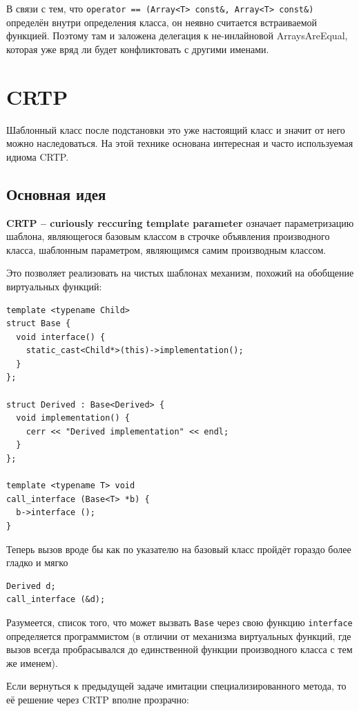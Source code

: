 \documentclass[a4paper,12pt,oneside]{book}
\begin{document}
В связи с тем, что \lstinline!operator == (Array<T> const&, Array<T> const&)! определён внутри определения класса, он неявно считается встраиваемой функцией. Поэтому там и заложена делегация к не-инлайновой ArraysAreEqual, которая уже вряд ли будет конфликтовать с другими именами.

\pagebreak
\section{CRTP}\label{CRTP}

Шаблонный класс после подстановки это уже настоящий класс и значит от него можно наследоваться. На этой технике основана интересная и часто используемая идиома CRTP.

\subsection{Основная идея}

\textbf{CRTP – curiously reccuring template parameter} означает параметризацию шаблона, являющегося базовым классом в строчке объявления производного класса, шаблонным параметром, являющимся самим производным классом. 

Это позволяет реализовать на чистых шаблонах механизм, похожий на обобщение виртуальных функций:

\begin{lstlisting}
template <typename Child>
struct Base {
  void interface() {
    static_cast<Child*>(this)->implementation();
  }
};

struct Derived : Base<Derived> {
  void implementation() {
    cerr << "Derived implementation" << endl;
  }
};

template <typename T> void
call_interface (Base<T> *b) {
  b->interface ();
}
\end{lstlisting}

Теперь вызов вроде бы как по указателю на базовый класс пройдёт гораздо более гладко и мягко

\begin{lstlisting}
Derived d;
call_interface (&d);
\end{lstlisting}

Разумеется, список того, что может вызвать \lstinline!Base! через свою функцию \lstinline!interface! определяется программистом (в отличии от механизма виртуальных функций, где вызов всегда пробрасывался до единственной функции производного класса с тем же именем).

Если вернуться к предыдущей задаче имитации специализированного метода, то её решение через CRTP вполне прозрачно:
\end{document}
